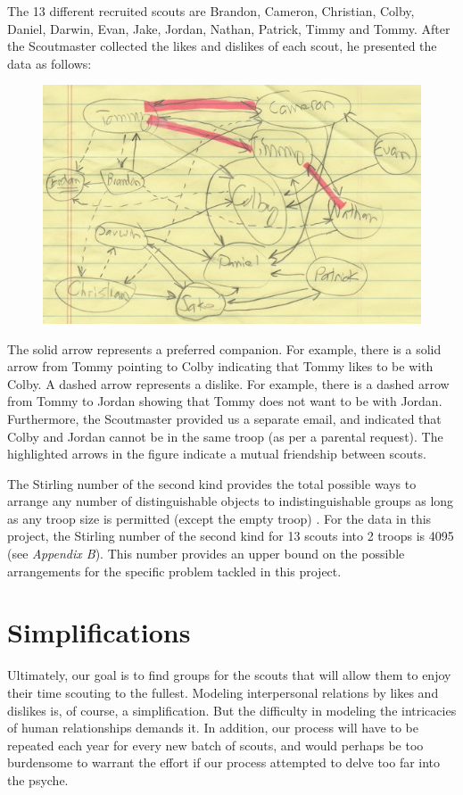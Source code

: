 \documentclass{amsart}
\theoremstyle{definition}
\theoremstyle{remark}
\numberwithin{equation}{section}
\begin{document}
The 13 different recruited scouts are Brandon, Cameron, Christian, Colby, Daniel, Darwin, Evan, Jake, Jordan, Nathan, Patrick, Timmy and Tommy. After the Scoutmaster collected the likes and dislikes of each scout, he presented the data as follows: 
\begin{figure}[h]
	\centering
	\includegraphics[scale=0.60]{graph}
\end{figure}

The solid arrow represents a preferred companion. For example, there is a solid arrow from Tommy pointing to Colby indicating that Tommy likes to be with Colby. A dashed arrow represents a dislike. For example, there is a dashed arrow from Tommy to Jordan showing that Tommy does not want to be with Jordan. Furthermore, the Scoutmaster provided us a separate email, and indicated that Colby and Jordan cannot be in the same troop (as per a parental request). The highlighted arrows in the figure indicate a mutual friendship between scouts.

The Stirling number of the second kind provides the total possible ways to arrange any number of distinguishable objects to indistinguishable groups as long as any troop size is permitted (except the empty troop) \cite{F}. For the data in this project, the Stirling number of the second kind for 13 scouts into 2 troops is 4095 (see \textit{Appendix B}). This number provides an upper bound on the possible arrangements for the specific problem tackled in this project.

\section*{Simplifications}
Ultimately, our goal is to find groups for the scouts that will allow them to enjoy their time scouting to the fullest. Modeling interpersonal relations by likes and dislikes is, of course, a simplification. But the difficulty in modeling the intricacies of human relationships demands it. In addition, our process will have to be repeated each year for every new batch of scouts, and would perhaps be too burdensome to warrant the effort if our process attempted to delve too far into the psyche.
\end{document}

